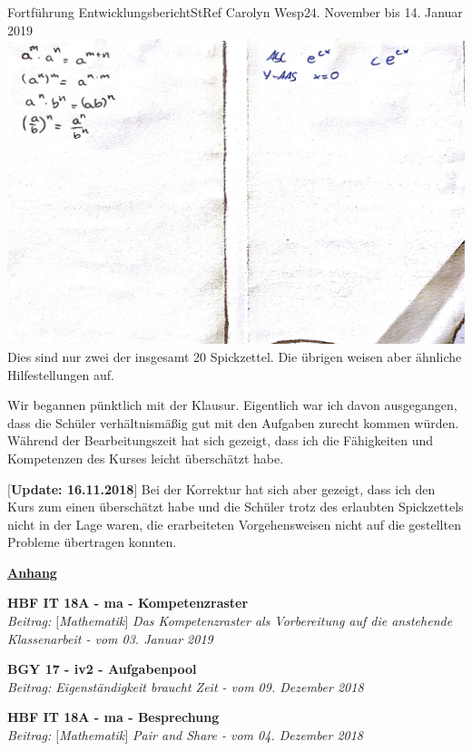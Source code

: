 \documentclass[oneside,openany,headings=optiontotoc,11pt,numbers=noenddot]{article}
\begin{document}
\begin{worksheet}{Fortführung Entwicklungsbericht}{StRef\grq{} Carolyn Wesp}{24. November bis 14. Januar 2019}
		\includegraphics[width=\textwidth]{SpZ2.jpg}\\
		Dies sind nur zwei der insgesamt 20 \grq{}Spickzettel\grq{}. Die übrigen weisen aber ähnliche Hilfestellungen auf.\\
		\par\noindent
		Wir begannen pünktlich mit der Klausur. Eigentlich war ich davon ausgegangen, dass die Schüler verhältnismäßig gut mit den Aufgaben zurecht kommen würden. Während der Bearbeitungszeit hat sich gezeigt, dass ich die Fähigkeiten und Kompetenzen des Kurses leicht überschätzt habe.
		\par
		\setlength{\leftskip}{1cm}
		\noindent
		\textbf{$\lbrack$Update: 16.11.2018$\rbrack$} Bei der Korrektur hat sich aber gezeigt, dass ich den Kurs zum einen überschätzt habe und die Schüler trotz des erlaubten \grq{}Spickzettels\grq{} nicht in der Lage waren, die erarbeiteten Vorgehensweisen nicht auf die gestellten Probleme übertragen konnten.
		\par
		\setlength{\leftskip}{0cm}
		\newpage
		\pagestyle{empty}
		\Huge{\ul{\textbf{Anhang}}}\\
		\par\noindent
		\Large{\textbf{HBF IT 18A - ma - Kompetenzraster}}\\\normalsize
		\textit{Beitrag: $\lbrack$Mathematik$\rbrack$ Das Kompetenzraster als Vorbereitung auf die anstehende Klassenarbeit - vom 03. Januar 2019}\\
		\par\noindent
		\Large{\textbf{BGY 17 - iv2 - Aufgabenpool}}\\\normalsize
		\textit{Beitrag: Eigenständigkeit braucht Zeit - vom 09. Dezember 2018}\\
		\par\noindent
		\Large{\textbf{HBF IT 18A - ma - Besprechung}}\\\normalsize
		\textit{Beitrag: $\lbrack$Mathematik$\rbrack$ Pair and Share - vom 04. Dezember 2018}\\
	\end{worksheet}
\end{document}
